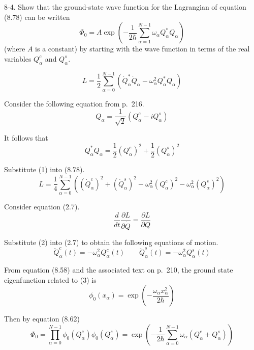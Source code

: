 \documentclass[12pt]{article}
\begin{document}
8-4.
Show that the ground-state wave function for the Lagrangian of
equation (8.78) can be written
\begin{equation*}
\Phi_0=A\exp\left(
-\frac{1}{2\hbar}
\sum_{\alpha=1}^{N-1}
\omega_\alpha Q_\alpha^*Q_\alpha
\right)
\tag{8.83}
\end{equation*}
(where $A$ is a constant) by starting with the wave function in terms of
the real variables $Q_\alpha^c$ and $Q_\alpha^s$.

\begin{equation*}
L=\frac{1}{2}\sum_{\alpha=0}^{N-1}
\left(\dot Q_\alpha^*\dot Q_\alpha-\omega_\alpha^2Q_\alpha^*Q_\alpha\right)
\tag{8.78}
\end{equation*}

Consider the following equation from p.~216.
\begin{equation*}
Q_\alpha=\frac{1}{\sqrt2}(Q_\alpha^c-iQ_\alpha^s)
\end{equation*}

It follows that
\begin{equation*}
Q_\alpha^*Q_\alpha
=\frac{1}{2}(Q_\alpha^c)^2+\frac{1}{2}(Q_\alpha^s)^2
\tag{1}
\end{equation*}

Substitute (1) into (8.78).
\begin{equation*}
L=\frac{1}{4}\sum_{\alpha=0}^{N-1}
\left(
(\dot Q_\alpha^c)^2
+(\dot Q_\alpha^s)^2
-\omega_\alpha^2(Q_\alpha^c)^2
-\omega_\alpha^2(Q_\alpha^s)^2
\right)
\tag{2}
\end{equation*}

Consider equation (2.7).
\begin{equation*}
\frac{d}{dt}\frac{\partial L}{\partial\dot Q}=\frac{\partial L}{\partial Q}
\tag{2.7}
\end{equation*}

Substitute (2) into (2.7) to obtain the following equations of motion.
\begin{equation*}
\ddot Q_\alpha^c(t)=-\omega_\alpha^2Q_\alpha^c(t)
\qquad
\ddot Q_\alpha^s(t)=-\omega_\alpha^2Q_\alpha^s(t)
\tag{3}
\end{equation*}

From equation (8.58) and the associated text on p.~210, the ground state eigenfunction related to (3) is
\begin{equation*}
\phi_0(x_\alpha)=\exp\left(-\frac{\omega_\alpha x_\alpha^2}{2\hbar}\right)
\end{equation*}

Then by equation (8.62)
\begin{equation*}
\Phi_0=\prod_{\alpha=0}^{N-1}\phi_0(Q_\alpha^c)\phi_0(Q_\alpha^s)
=\exp\left(-\frac{1}{2\hbar}\sum_{\alpha=0}^{N-1}\omega_\alpha(Q_\alpha^c+Q_\alpha^s)\right)
\end{equation*}
\end{document}
